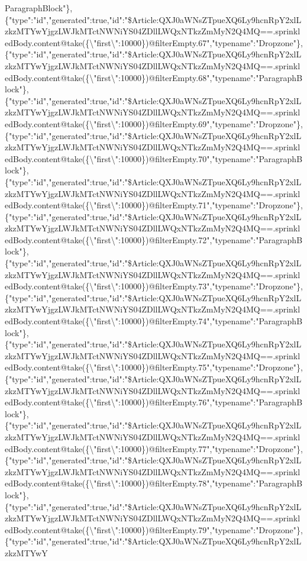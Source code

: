 ParagraphBlock"\},\{"type":"id","generated":true,"id":"\$Article:QXJ0aWNsZTpueXQ6Ly9hcnRpY2xlLzkzMTYwYjgzLWJkMTctNWNiYS04ZDllLWQxNTkzZmMyN2Q4MQ==.sprinkledBody.content@take(\{\textbackslash{}"first\textbackslash{}":10000\})@filterEmpty.67","typename":"Dropzone"\},\{"type":"id","generated":true,"id":"\$Article:QXJ0aWNsZTpueXQ6Ly9hcnRpY2xlLzkzMTYwYjgzLWJkMTctNWNiYS04ZDllLWQxNTkzZmMyN2Q4MQ==.sprinkledBody.content@take(\{\textbackslash{}"first\textbackslash{}":10000\})@filterEmpty.68","typename":"ParagraphBlock"\},\{"type":"id","generated":true,"id":"\$Article:QXJ0aWNsZTpueXQ6Ly9hcnRpY2xlLzkzMTYwYjgzLWJkMTctNWNiYS04ZDllLWQxNTkzZmMyN2Q4MQ==.sprinkledBody.content@take(\{\textbackslash{}"first\textbackslash{}":10000\})@filterEmpty.69","typename":"Dropzone"\},\{"type":"id","generated":true,"id":"\$Article:QXJ0aWNsZTpueXQ6Ly9hcnRpY2xlLzkzMTYwYjgzLWJkMTctNWNiYS04ZDllLWQxNTkzZmMyN2Q4MQ==.sprinkledBody.content@take(\{\textbackslash{}"first\textbackslash{}":10000\})@filterEmpty.70","typename":"ParagraphBlock"\},\{"type":"id","generated":true,"id":"\$Article:QXJ0aWNsZTpueXQ6Ly9hcnRpY2xlLzkzMTYwYjgzLWJkMTctNWNiYS04ZDllLWQxNTkzZmMyN2Q4MQ==.sprinkledBody.content@take(\{\textbackslash{}"first\textbackslash{}":10000\})@filterEmpty.71","typename":"Dropzone"\},\{"type":"id","generated":true,"id":"\$Article:QXJ0aWNsZTpueXQ6Ly9hcnRpY2xlLzkzMTYwYjgzLWJkMTctNWNiYS04ZDllLWQxNTkzZmMyN2Q4MQ==.sprinkledBody.content@take(\{\textbackslash{}"first\textbackslash{}":10000\})@filterEmpty.72","typename":"ParagraphBlock"\},\{"type":"id","generated":true,"id":"\$Article:QXJ0aWNsZTpueXQ6Ly9hcnRpY2xlLzkzMTYwYjgzLWJkMTctNWNiYS04ZDllLWQxNTkzZmMyN2Q4MQ==.sprinkledBody.content@take(\{\textbackslash{}"first\textbackslash{}":10000\})@filterEmpty.73","typename":"Dropzone"\},\{"type":"id","generated":true,"id":"\$Article:QXJ0aWNsZTpueXQ6Ly9hcnRpY2xlLzkzMTYwYjgzLWJkMTctNWNiYS04ZDllLWQxNTkzZmMyN2Q4MQ==.sprinkledBody.content@take(\{\textbackslash{}"first\textbackslash{}":10000\})@filterEmpty.74","typename":"ParagraphBlock"\},\{"type":"id","generated":true,"id":"\$Article:QXJ0aWNsZTpueXQ6Ly9hcnRpY2xlLzkzMTYwYjgzLWJkMTctNWNiYS04ZDllLWQxNTkzZmMyN2Q4MQ==.sprinkledBody.content@take(\{\textbackslash{}"first\textbackslash{}":10000\})@filterEmpty.75","typename":"Dropzone"\},\{"type":"id","generated":true,"id":"\$Article:QXJ0aWNsZTpueXQ6Ly9hcnRpY2xlLzkzMTYwYjgzLWJkMTctNWNiYS04ZDllLWQxNTkzZmMyN2Q4MQ==.sprinkledBody.content@take(\{\textbackslash{}"first\textbackslash{}":10000\})@filterEmpty.76","typename":"ParagraphBlock"\},\{"type":"id","generated":true,"id":"\$Article:QXJ0aWNsZTpueXQ6Ly9hcnRpY2xlLzkzMTYwYjgzLWJkMTctNWNiYS04ZDllLWQxNTkzZmMyN2Q4MQ==.sprinkledBody.content@take(\{\textbackslash{}"first\textbackslash{}":10000\})@filterEmpty.77","typename":"Dropzone"\},\{"type":"id","generated":true,"id":"\$Article:QXJ0aWNsZTpueXQ6Ly9hcnRpY2xlLzkzMTYwYjgzLWJkMTctNWNiYS04ZDllLWQxNTkzZmMyN2Q4MQ==.sprinkledBody.content@take(\{\textbackslash{}"first\textbackslash{}":10000\})@filterEmpty.78","typename":"ParagraphBlock"\},\{"type":"id","generated":true,"id":"\$Article:QXJ0aWNsZTpueXQ6Ly9hcnRpY2xlLzkzMTYwYjgzLWJkMTctNWNiYS04ZDllLWQxNTkzZmMyN2Q4MQ==.sprinkledBody.content@take(\{\textbackslash{}"first\textbackslash{}":10000\})@filterEmpty.79","typename":"Dropzone"\},\{"type":"id","generated":true,"id":"\$Article:QXJ0aWNsZTpueXQ6Ly9hcnRpY2xlLzkzMTYwY